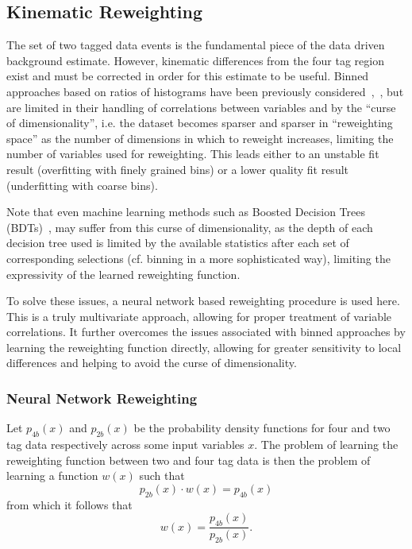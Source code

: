 \subsection{Kinematic Reweighting}
The set of two tagged data events is the fundamental piece of the data driven
background estimate. However, kinematic differences from the four tag region
exist and must be corrected in order for this estimate to be useful. Binned 
approaches based on ratios of histograms have been previously considered~\cite{EXOT-2016-31},~\cite{HDBS-2018-18}, 
but are limited in their handling of correlations 
between variables and by the ``curse of dimensionality'', i.e. the dataset
becomes sparser and sparser in ``reweighting space'' as the number of dimensions
in which to reweight increases, limiting the number of variables used for reweighting. 
This leads either to an unstable fit result (overfitting with finely grained bins) or a 
lower quality fit result (underfitting with coarse bins).

Note that even machine learning methods such as Boosted Decision Trees (BDTs)~\cite{BDT-RW}, may suffer
from this curse of dimensionality, as the depth of each decision tree used is limited by 
the available statistics after each set of corresponding selections (cf. binning in a 
more sophisticated way), limiting the expressivity of the learned reweighting function.

To solve these issues, a neural network based reweighting procedure is used
here. This is a truly multivariate approach, allowing for proper treatment of
variable correlations. It further overcomes the issues associated with binned
approaches by learning the reweighting function directly, allowing for greater
sensitivity to local differences and helping to avoid the curse of
dimensionality.


\subsubsection{Neural Network Reweighting}
Let $p_{4b}(x)$ and $p_{2b}(x)$ be the probability density functions for four and two tag data respectively across 
some input variables $x$. The problem of learning the reweighting function between two and four tag data 
is then the problem of learning a function $w(x)$ such that
\begin{equation}
p_{2b}(x) \cdot w(x) = p_{4b}(x)
\end{equation}
from which it follows that
\begin{equation}
w(x) = \frac{p_{4b}(x)}{p_{2b}(x)}.
\end{equation}

